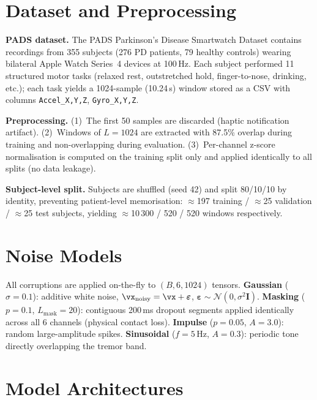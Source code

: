 \documentclass{article}
\begin{document}
\section{Dataset and Preprocessing}
\label{sec:data}

\textbf{PADS dataset.}
The PADS Parkinson's Disease Smartwatch Dataset \citep{varghese2023pads}
contains recordings from 355 subjects (276 PD patients, 79 healthy controls)
wearing bilateral Apple Watch Series~4 devices at 100\,Hz.
Each subject performed 11 structured motor tasks
(relaxed rest, outstretched hold, finger-to-nose, drinking, etc.);
each task yields a 1024-sample (10.24\,s) window stored as a CSV with columns
\texttt{Accel\_{X,Y,Z}}, \texttt{Gyro\_{X,Y,Z}}.

\textbf{Preprocessing.}
(1)~The first 50 samples are discarded (haptic notification artifact).
(2)~Windows of $L=1024$ are extracted with 87.5\% overlap during training and
non-overlapping during evaluation.
(3)~Per-channel z-score normalisation is computed on the training split only
and applied identically to all splits (no data leakage).

\textbf{Subject-level split.}
Subjects are shuffled (seed 42) and split 80/10/10 by identity, preventing
patient-level memorisation:
$\approx$197 training / $\approx$25 validation / $\approx$25 test subjects,
yielding $\approx$10\,300 / 520 / 520 windows respectively.

\section{Noise Models}
\label{sec:noise}

All corruptions are applied on-the-fly to $(B,6,1024)$ tensors.
\textbf{Gaussian} ($\sigma=0.1$): additive white noise,
$\vx_\text{noisy}=\vx+\boldsymbol{\varepsilon}$,
$\boldsymbol{\varepsilon}\!\sim\!\mathcal{N}(0,\sigma^2\mathbf{I})$.
\textbf{Masking} ($p=0.1$, $L_\text{mask}=20$): contiguous 200\,ms dropout
segments applied identically across all 6 channels (physical contact loss).
\textbf{Impulse} ($p=0.05$, $A=3.0$): random large-amplitude spikes.
\textbf{Sinusoidal} ($f=5$\,Hz, $A=0.3$): periodic tone directly overlapping
the tremor band.

\section{Model Architectures}
\label{sec:models}
\end{document}
